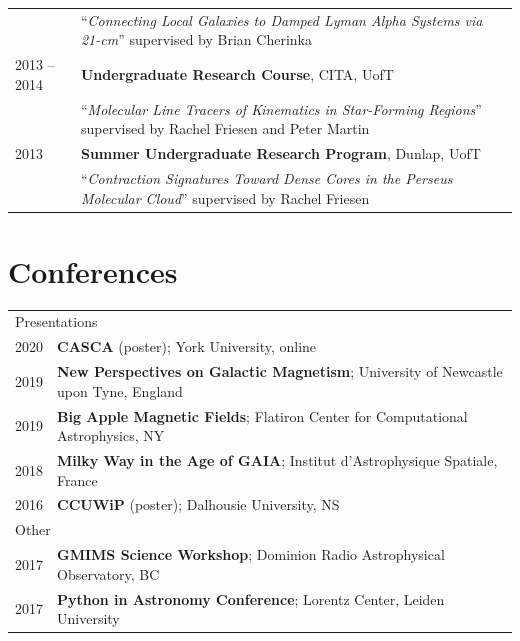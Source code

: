 \documentclass[10pt]{res} %
\begin{document}
\begin{resume}
\begin{table}[h!]
\begin{tabularx}{\textwidth}{ @{} p{6.5em} X @{} }
         & ``\textit{Connecting Local Galaxies to Damped Lyman Alpha Systems via 21-cm}'' supervised by Brian Cherinka \\
2013 -- 2014 &\textbf{Undergraduate Research Course}, CITA, UofT \\
                     & ``\textit{Molecular Line Tracers of Kinematics in Star-Forming Regions}'' supervised by Rachel Friesen and Peter Martin \\
2013 & \textbf{Summer Undergraduate Research Program}, Dunlap, UofT \\
         & ``\textit{Contraction Signatures Toward Dense Cores in the Perseus Molecular Cloud}'' supervised by Rachel Friesen
\end{tabularx}
\end{table}


\section{\Large Conferences}
\vspace{-5pt} %
\noindent\makebox[\linewidth]{\rule{\textwidth}{0.4pt}}
\vspace{-20pt} %

\begin{table}[h!]
\begin{tabularx}{\textwidth}{lX}
\multicolumn{2}{l}{ \rule{0pt}{3ex} \large \hspace{-12pt} Presentations \dotfill \rule[-1.2ex]{0pt}{0pt}} \\
2020 & \textbf{CASCA} (poster); York University, online \\
2019 & \textbf{New Perspectives on Galactic Magnetism}; University of Newcastle upon Tyne, England \\
2019 & \textbf{Big Apple Magnetic Fields}; Flatiron Center for Computational Astrophysics, NY \\
2018 & \textbf{Milky Way in the Age of GAIA}; Institut d'Astrophysique Spatiale, France \\
2016 & \textbf{CCUWiP} (poster); Dalhousie University, NS \\
\multicolumn{2}{l}{ \rule{0pt}{3ex} \large \hspace{-12pt} Other \dotfill \rule[-1.2ex]{0pt}{0pt}}  \\
2017 & \textbf{GMIMS Science Workshop}; Dominion Radio Astrophysical Observatory, BC \\
2017 & \textbf{Python in Astronomy Conference}; Lorentz Center, Leiden University 
\end{tabularx}
\end{table}


\end{resume}
\end{document}
